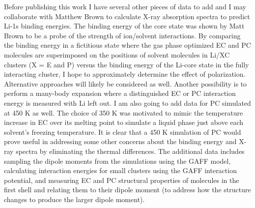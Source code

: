 \begin{ecpc}
   Before publishing this work I have several other pieces of data to add and I may collaborate with Matthew Brown to calculate X-ray absorption spectra to predict Li\sur{+}-1s binding
   energies. The binding energy of the core state was shown by Matt Brown to be a probe of the strength of ion/solvent interactions\cite{brown2015ion}. By comparing the binding energy
   in a fictitious state where the gas phase optimized EC and PC molecules are superimposed on the positions of solvent molecules in Li\sur{+}/XC clusters (X = E and P) versus 
   the binding energy of the Li-core state in the fully interacting cluster, I hope to approximately determine the effect of polarization. Alternative approaches will likely be 
   considered as well. Another possibility is to perform a many-body expansion where a distinguished EC or PC interaction energy is measured with Li\sur{+} left out.
   I am also going to add data for PC simulated at 450 K as well. The choice of 350 K was motivated to mimic the temperature increase in EC over its melting point 
   to simulate a liquid phase just above each solvent's freezing temperature. It is clear that a 450 K simulation of PC would prove useful in addressing some other concerns about the
   binding energy and X-ray spectra by eliminating the thermal differences. The additional data includes sampling the dipole moments from the simulations using the GAFF model, calculating 
   interaction energies for small clusters using the GAFF interaction potential, and measuring EC and PC structural properties of molecules in the first shell and relating them to their
   dipole moment (to address how the structure changes to produce the larger dipole moment).
  
\end{ecpc}

